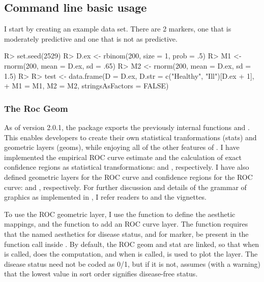\documentclass[codesnippet]{jss}
\begin{document}
\subsection{Command line basic usage}\label{command-line-basic-usage}

I start by creating an example data set. There are 2 markers, one that
is moderately predictive and one that is not as predictive.

\begin{Schunk}
\begin{Sinput}
R> set.seed(2529)
R> D.ex <- rbinom(200, size = 1, prob = .5)
R> M1 <- rnorm(200, mean = D.ex, sd = .65)
R> M2 <- rnorm(200, mean = D.ex, sd = 1.5)
R> 
R> test <- data.frame(D = D.ex, D.str = c("Healthy", "Ill")[D.ex + 1], 
+                    M1 = M1, M2 = M2, stringsAsFactors = FALSE)
\end{Sinput}
\end{Schunk}

\subsubsection{The Roc Geom}\label{the-roc-geom}

As of version 2.0.1, the  package \citep{ggplot2} exports
the previously internal functions  and . This
enables developers to create their own statistical tranformations
(stats) and geometric layers (geoms), while enjoying all of the other
features of . I have implemented the empirical ROC curve
estimate and the calculation of exact confidence regions as statistical
transformations:  and , respectively. I
have also defined geometric layers for the ROC curve and confidence
regions for the ROC curve:  and ,
respectively. For further discussion and details of the grammar of
graphics as implemented in , I refer readers to
\citet{wickham2010layered} and the  vignettes.

To use the ROC geometric layer, I use the  function to
define the aesthetic mappings, and the  function to add
an ROC curve layer. The  function requires that the named
aesthetics  for disease status, and  for marker, be
present in the  function call inside . By
default, the ROC geom and stat are linked, so that when 
is called,  does the computation, and when
 is called,  is used to plot the layer.
The disease status need not be coded as 0/1, but if it is not,
 assumes (with a warning) that the lowest value in sort
order signifies disease-free status.
\end{document}
